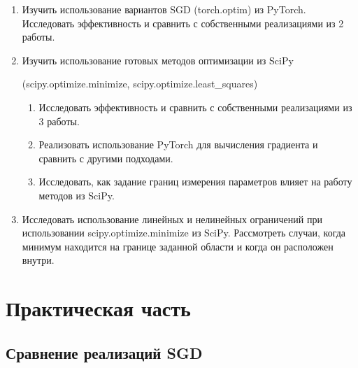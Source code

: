 \documentclass[a4paper,14pt,oneside,openany]{memoir}
\begin{document}
\begin{enumerate}
\item Изучить использование вариантов SGD (torch.optim) из PyTorch. Исследовать эффективность и сравнить с собственными реализациями из 2 работы.
\item Изучить использование готовых методов оптимизации из SciPy 

(scipy.optimize.minimize, scipy.optimize.least\_squares) 
\begin{enumerate}
\item Исследовать эффективность и сравнить с собственными реализациями из 3 работы.
\item Реализовать использование PyTorch для вычисления градиента и сравнить с другими подходами.
\item Исследовать, как задание границ измерения параметров влияет на работу методов из SciPy.
\end{enumerate}
\item Исследовать использование линейных и нелинейных ограничений при использовании scipy.optimize.minimize из SciPy. Рассмотреть случаи, когда минимум находится на границе заданной области и когда он расположен внутри.
\end{enumerate}

\chapter{Практическая часть}
 
\section{Сравнение реализаций SGD}
\end{document}
